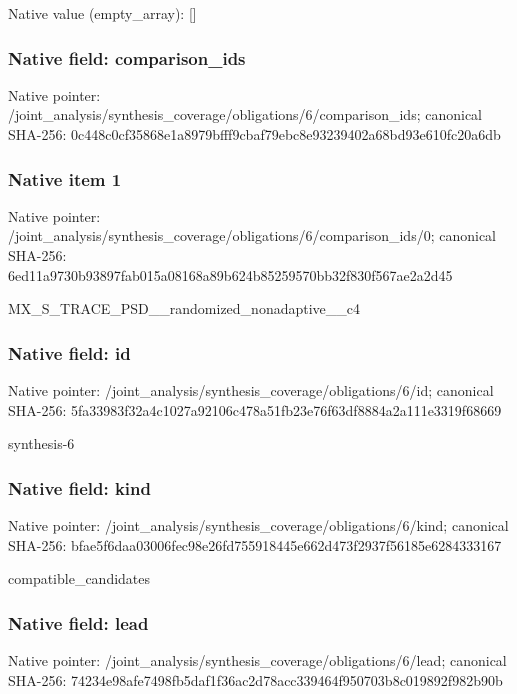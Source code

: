 \documentclass[10pt,a4paper]{article}
\begin{document}
Native value (empty\_\allowbreak{}array): []

\subsubsection{Native field: comparison\_\allowbreak{}ids}
Native pointer: /joint\_\allowbreak{}analysis/synthesis\_\allowbreak{}coverage/obligations/6/comparison\_\allowbreak{}ids; canonical SHA-256: 0c448c0cf35868e1a8979bfff9cbaf79ebc8e93239402a68bd93e610fc20a6db

\subsubsection{Native item 1}
Native pointer: /joint\_\allowbreak{}analysis/synthesis\_\allowbreak{}coverage/obligations/6/comparison\_\allowbreak{}ids/0; canonical SHA-256: 6ed11a9730b93897fab015a08168a89b624b85259570bb32f830f567ae2a2d45

\begingroup\raggedright\sloppy MX\_\allowbreak{}S\_\allowbreak{}TRACE\_\allowbreak{}PSD\_\allowbreak{}\_\allowbreak{}randomized\_\allowbreak{}nonadaptive\_\allowbreak{}\_\allowbreak{}c4\par\endgroup

\subsubsection{Native field: id}
Native pointer: /joint\_\allowbreak{}analysis/synthesis\_\allowbreak{}coverage/obligations/6/id; canonical SHA-256: 5fa33983f32a4c1027a92106c478a51fb23e76f63df8884a2a111e3319f68669

\begingroup\raggedright\sloppy synthesis-6\par\endgroup

\subsubsection{Native field: kind}
Native pointer: /joint\_\allowbreak{}analysis/synthesis\_\allowbreak{}coverage/obligations/6/kind; canonical SHA-256: bfae5f6daa03006fec98e26fd755918445e662d473f2937f56185e6284333167

\begingroup\raggedright\sloppy compatible\_\allowbreak{}candidates\par\endgroup

\subsubsection{Native field: lead}
Native pointer: /joint\_\allowbreak{}analysis/synthesis\_\allowbreak{}coverage/obligations/6/lead; canonical SHA-256: 74234e98afe7498fb5daf1f36ac2d78acc339464f950703b8c019892f982b90b
\end{document}
